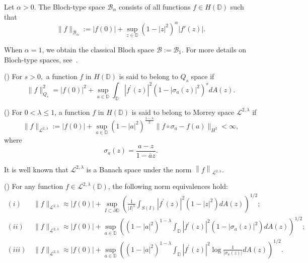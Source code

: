 \documentclass[12pt, reqno]{amsart}
\begin{document}
\begin{definition}
{\rm Let $\alpha > 0$. The Bloch-type space $\mathcal{B}_\alpha$ consists of all functions $f \in H(\mathbb{D})$ such that
\[\|f\|_{\mathcal{B}_\alpha} := |f(0)| + \sup_{z \in \mathbb{D}} \left(1-|z|^2\right)^\alpha |f'(z)|.\]}
\end{definition}
When $\alpha = 1$, we obtain the classical Bloch space $\mathcal{B} := \mathcal{B}_1$. For more details on Bloch-type spaces, see~\cite{ZK1}.

\begin{definition} {\rm (\cite{XJ2})
For $s>0,$ a function $f$ in $H(\mathbb{D})$ is said to belong to $Q_{s}$ space if
$$\|f\|_{Q_s}^2 =|f(0)|^2+ \sup _{a \in \mathbb{D}} \int_{\mathbb{D}}\left|f^{\prime}(z)\right|^{2}\left(1-\left|\sigma_{a}(z)\right|^{2}\right)^{s} dA(z).$$ }
\end{definition}

\begin{definition} {\rm (\cite{LL})
	For $0<\lambda\leq1$, a function $f$ in $H(\mathbb{D})$ is said to belong to Morrey space $\mathcal{L}^{2,\lambda}$ if
	$$\|f\|_{\mathcal{L}^{2,\lambda}}:=|f(0)|+	\sup\limits_{a\in\mathbb{D}} (1-|a|^{2})^{\frac{1-\lambda}{2}}\|f\circ\sigma_a-f(a)\|_{H^2}<\infty,$$
	where $$\sigma_{a}(z)=\frac{a-z}{1-\overline{a}z}.$$} 
\end{definition}
It is well known that $\mathcal{L}^{2,\lambda }$ is a Banach space under the norm $\left \| f \right \|_{\mathcal{L}^{2,\lambda } }.$

\begin{lemma}\label{equivalent conditions} {\rm (\cite{LL,WJ,XJ2})}
	For any function $f \in \mathcal{L}^{2, \lambda}(\mathbb{D}) $, the following norm equivalences hold: 
	\begin{align*}
		(i)\, & \|f\|_{\mathcal{L}^{2, \lambda}}\approx|f(0)|+\sup _{I \subset \partial \mathbb{D}}\left(\frac{1}{|I|^{\lambda}} \int_{S(I)}\left|f^{\prime}(z)\right|^{2}\left(1-|z|^{2}\right) d A(z)\right)^{1 / 2}  ;\\
		(ii)\, &\|f\|_{\mathcal{L}^{2, \lambda}}\approx|f(0)|+\sup _{a \in \mathbb{D}}\left(\left(1-|a|^{2}\right)^{1-\lambda} \int_{\mathbb{D}}\left|f^{\prime}(z)\right|^{2}\left(1-\left|\sigma_{a}(z)\right|^{2}\right) d A(z)\right)^{1 / 2} ;\\
		(iii)\, &\|f\|_{\mathcal{L}^{2, \lambda}}\approx|f(0)|+\sup _{a \in \mathbb{D}}\left(\left(1-|a|^{2}\right)^{1-\lambda} \int_{\mathbb{D}}\left|f^{\prime}(z)\right|^{2} \log \frac{1}{\left|\sigma_{a}(z)\right|} d A(z)\right)^{1 / 2}.
	\end{align*}
\end{lemma}
\end{document}
